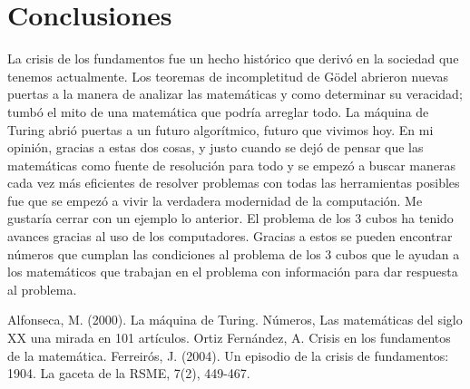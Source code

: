 \documentclass[conference,compsoc]{IEEEtran}
\begin{document}
\section {Conclusiones}
La crisis de los fundamentos fue un hecho histórico que derivó en la sociedad que tenemos actualmente. 
\newline
Los teoremas de incompletitud de Gödel abrieron nuevas puertas a la manera de analizar las matemáticas y como determinar su veracidad; tumbó el mito de una matemática que podría arreglar todo.
\newline
La máquina de Turing abrió puertas a un futuro algorítmico, futuro que vivimos hoy.
\newline
En mi opinión, gracias a estas dos cosas, y justo cuando se dejó de pensar que las matemáticas como fuente de resolución para todo y se empezó a buscar maneras cada vez más eficientes de resolver problemas con todas las herramientas posibles fue que se empezó a vivir la verdadera modernidad de la computación.
\newline
Me gustaría cerrar con un ejemplo lo anterior.
\newline
El problema de los 3 cubos ha tenido avances gracias al uso de los computadores. Gracias a estos se pueden encontrar números que cumplan las condiciones al problema de los 3 cubos que le ayudan a los matemáticos que trabajan en el problema con información para dar respuesta al problema.
\begin{thebibliography}{3}
 Alfonseca, M. (2000). La máquina de Turing. Números, Las matemáticas del siglo XX una mirada en 101 artículos.
 Ortiz Fernández, A. Crisis en los fundamentos de la matemática.
 Ferreirós, J. (2004). Un episodio de la crisis de fundamentos: 1904. La gaceta de la RSME, 7(2), 449-467.
\end{thebibliography}
\end{document}
